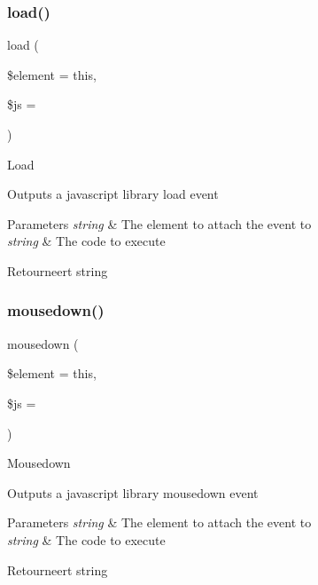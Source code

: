 \subsubsection{\texorpdfstring{load()}{load()}}
{\footnotesize\ttfamily load (\begin{DoxyParamCaption}\item[{}]{\$element = {\ttfamily \textquotesingle{}this\textquotesingle{}},  }\item[{}]{\$js = {\ttfamily \textquotesingle{}\textquotesingle{}} }\end{DoxyParamCaption})}

Load

Outputs a javascript library load event


\begin{DoxyParams}{Parameters}
{\em string} & The element to attach the event to \\
\hline
{\em string} & The code to execute \\
\hline
\end{DoxyParams}
\begin{DoxyReturn}{Retourneert}
string 
\end{DoxyReturn}
\mbox{\label{class_c_i___javascript_afa625106ad51c2f80ccfadf94981041d}} 
\subsubsection{\texorpdfstring{mousedown()}{mousedown()}}
{\footnotesize\ttfamily mousedown (\begin{DoxyParamCaption}\item[{}]{\$element = {\ttfamily \textquotesingle{}this\textquotesingle{}},  }\item[{}]{\$js = {\ttfamily \textquotesingle{}\textquotesingle{}} }\end{DoxyParamCaption})}

Mousedown

Outputs a javascript library mousedown event


\begin{DoxyParams}{Parameters}
{\em string} & The element to attach the event to \\
\hline
{\em string} & The code to execute \\
\hline
\end{DoxyParams}
\begin{DoxyReturn}{Retourneert}
string 
\end{DoxyReturn}
\mbox{\label{class_c_i___javascript_ab2d069b9fbd0500e0f514e9ec5dc94e1}} 

